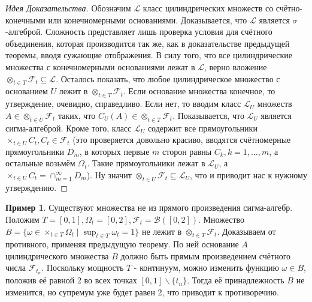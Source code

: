 \documentclass[16pt]{article}
\theoremstyle{definition}
\newtheorem{example}{Пример}[theorem]
\begin{document}
\begin{proof}[Идея Доказательства]
Обозначим $\mathcal{L}$ класс цилиндрических множеств со счётно-конечными или конечномерными основаниями. Доказывается, что $\mathcal{L}$ является $\sigma$-алгеброй. Сложность представляет лишь проверка условия для счётного объединения, которая производится так же, как в доказательстве предыдущей теоремы, вводя сужающие отображения. \newline В силу того, что все цилиндрические множества с конечномерными основаниями лежат в $\mathcal{L}$, верно вложение $\otimes_{t \in T}\mathcal{F}_t \subseteq \mathcal{L}$. Осталось показать, что любое цилиндрическое множество с основанием $U$ лежит в $\otimes_{t \in T}\mathcal{F}_t$. Если основание множества конечное, то утверждение, очевидно, справедливо. Если нет, то вводим класс $\mathcal{L}_U$ множеств $A \in \otimes_{t \in U}\mathcal{F}_t$ таких, что $C_U(A) \in \otimes_{t \in T}\mathcal{F}_t$. Показывается, что $\mathcal{L}_U$ является сигма-алгеброй. Кроме того, класс $\mathcal{L}_U$ содержит все прямоугольники $\times_{t \in U}C_t, C_t \in \mathcal{F}_t$ (это проверяется довольно красиво, вводятся счётномерные прямоугольники $D_m$, в которых первые $m$ сторон равны $C_k, k = 1, \ldots, m$, а остальные возьмём $\Omega_t$. Такие прямоугольники лежат в $\mathcal{L}_U$, а $\times_{t \in U}C_t = \cap_{m = 1}^\infty D_m$). Ну значит $\otimes_{t \in U}\mathcal{F}_t \subseteq \mathcal{L}_U$, что и приводит нас к нужному утверждению.
\end{proof}
\begin{example}
Существуют множества не из прямого произведения сигма-алгебр. Положим $T = [0, 1], \Omega_t = [0, 2], \mathcal{F}_t = \mathcal{B}([0, 2])$. Множество $B = \{\omega \in \times_{t \in T}\Omega_t \mid \sup_{t \in T}\omega_t = 1\}$ не лежит в $\otimes_{t \in T}\mathcal{F}_t$. Доказываем от противного, применяя предыдущую теорему. По ней основание $A$ цилиндрического множества $B$ должно быть прямым произведением счётного числа $\mathcal{F}_{t_n}$. Поскольку мощность $T$ - континуум, можно изменить функцию $\omega \in B$, положив её равной 2 во всех точках $[0, 1] \backslash \{t_n\}$. Тогда её принадлежность $B$ не изменится, но супремум уже будет равен 2, что приводит к противоречию.
\end{example}
\end{document}
